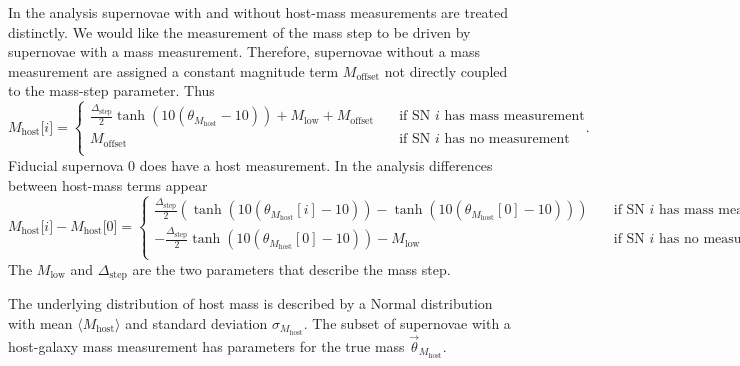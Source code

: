 \documentclass{aastex61}   	%
\begin{document}
In the analysis supernovae with and without host-mass measurements are treated distinctly.  We would like the measurement
of the mass step to be driven by supernovae with a mass measurement.  Therefore, supernovae
without a mass measurement are assigned a constant magnitude term $M_{\mathrm{offset}}$
not directly coupled to the mass-step parameter.  Thus
\begin{equation}
M_{\mathrm{host}}\mathrm[i]=\begin{cases}
\frac{\Delta_{\mathrm{step}}}{2}
\tanh{\left(10(\theta_{M_{\text{host}}}-10)\right)+ M_{\mathrm{low}} + M_{\mathrm{offset}}}& \quad \text{if SN }i\text{ has mass measurement} \\
M_{\mathrm{offset}} & \quad \text{if SN }i\text{ has no measurement}  \\
\end{cases}.
\end{equation}
Fiducial supernova 0 does have a host measurement.
In the analysis differences between host-mass terms appear
\begin{equation}
M_{\mathrm{host}}\mathrm[i] -M_{\mathrm{host}}\mathrm[0]  = 
\begin{cases}
\frac{\Delta_{\mathrm{step}}}{2} \left(
\tanh{\left(10(\theta_{M_{\text{host}}}[i]-10)\right)} - \tanh{\left(10(\theta_{M_{\text{host}}}[0]-10)\right)} \right)
& \quad \text{if SN }i\text{ has mass measurement} \\
-\frac{\Delta_{\mathrm{step}}}{2}  \tanh{\left(10(\theta_{M_{\text{host}}}[0]-10)\right)} - M_{\mathrm{low}}
 & \quad \text{if SN }i\text{ has no measurement}  \\
\end{cases}.
\end{equation}
The $M_{\mathrm{low}}$ and $\Delta_{\mathrm{step}}$ are the two parameters that describe the mass step.

The underlying distribution of host mass is described by a Normal distribution with mean
$\langle M_{\text{host}} \rangle$ and standard deviation
$\sigma_{M_{\text{host}}}$.
The subset of supernovae with a host-galaxy mass measurement has parameters for the true mass $\vec{\theta}_{M_{\text{host}}}$.
\end{document}
